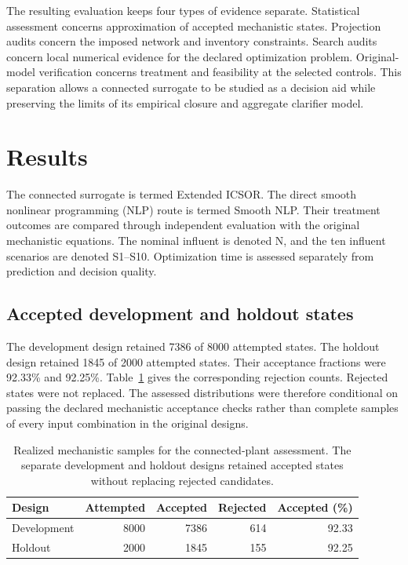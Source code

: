The resulting evaluation keeps four types of evidence separate. Statistical assessment concerns approximation of accepted mechanistic states. Projection audits concern the imposed network and inventory constraints. Search audits concern local numerical evidence for the declared optimization problem. Original-model verification concerns treatment and feasibility at the selected controls. This separation allows a connected surrogate to be studied as a decision aid while preserving the limits of its empirical closure and aggregate clarifier model.

\section{Results}
\label{sec:plant_results}

The connected surrogate is termed Extended ICSOR. The direct smooth nonlinear programming (NLP) route is termed Smooth NLP. Their treatment outcomes are compared through independent evaluation with the original mechanistic equations. The nominal influent is denoted N, and the ten influent scenarios are denoted S1--S10. Optimization time is assessed separately from prediction and decision quality.

\subsection{Accepted development and holdout states}

The development design retained 7386 of 8000 attempted states. The holdout design retained 1845 of 2000 attempted states. Their acceptance fractions were 92.33\% and 92.25\%. Table~\ref{tab:plant_sample_results} gives the corresponding rejection counts. Rejected states were not replaced. The assessed distributions were therefore conditional on passing the declared mechanistic acceptance checks rather than complete samples of every input combination in the original designs.

\begin{table}[htbp]
\centering\small
\caption{Realized mechanistic samples for the connected-plant assessment. The separate development and holdout designs retained accepted states without replacing rejected candidates.}
\label{tab:plant_sample_results}
\begin{tabular}{lrrrr}
\toprule
Design & Attempted & Accepted & Rejected & Accepted (\%)\\
\midrule
Development & 8000 & 7386 & 614 & 92.33\\
Holdout & 2000 & 1845 & 155 & 92.25\\
\bottomrule
\end{tabular}
\end{table}


